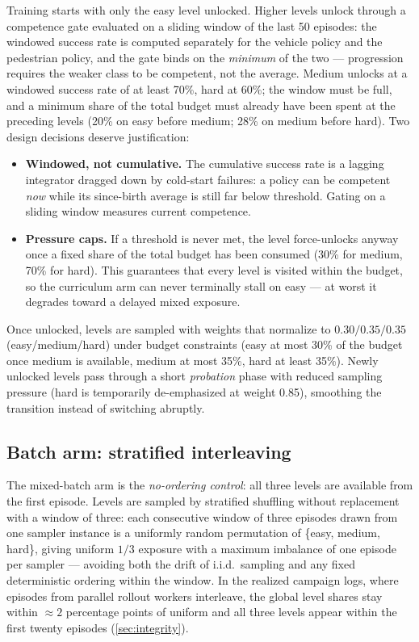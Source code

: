 Training starts with only the easy level unlocked. Higher levels unlock
through a competence gate evaluated on a sliding window of the last 50
episodes: the windowed success rate is computed separately for the vehicle
policy and the pedestrian policy, and the gate binds on the \emph{minimum}
of the two --- progression requires the weaker class to be competent, not
the average. Medium unlocks at a windowed success rate of at least 70\%,
hard at 60\%; the window must be full, and a minimum share of the total
budget must already have been spent at the preceding levels (20\% on easy
before medium; 28\% on medium before hard). Two design decisions deserve
justification:

\begin{itemize}
  \item \textbf{Windowed, not cumulative.} The cumulative success rate is
        a lagging integrator dragged down by cold-start failures: a policy
        can be competent \emph{now} while its since-birth average is still
        far below threshold. Gating on a sliding window measures current
        competence.
  \item \textbf{Pressure caps.} If a threshold is never met, the level
        force-unlocks anyway once a fixed share of the total budget has
        been consumed (30\% for medium, 70\% for hard). This guarantees
        that every level is visited within the budget, so the curriculum
        arm can never terminally stall on easy --- at worst it degrades
        toward a delayed mixed exposure.
\end{itemize}

Once unlocked, levels are sampled with weights that normalize to
$0.30/0.35/0.35$ (easy/medium/hard) under budget constraints (easy at most
30\% of the budget once medium is available, medium at most 35\%, hard at
least 35\%). Newly unlocked levels pass through a short \emph{probation}
phase with reduced sampling pressure (hard is temporarily de-emphasized at
weight 0.85), smoothing the transition instead of switching abruptly.

\subsection{Batch arm: stratified interleaving}
\label{sec:batch-arm}

The mixed-batch arm is the \emph{no-ordering control}: all three levels
are available from the first episode. Levels are sampled by stratified
shuffling without replacement with a window of three: each consecutive
window of three episodes drawn from one sampler instance is a uniformly
random permutation of \{easy, medium, hard\}, giving uniform $1/3$
exposure with a maximum imbalance of one episode per sampler --- avoiding
both the drift of i.i.d.\ sampling and any fixed deterministic ordering
within the window. In the realized campaign logs, where episodes from
parallel rollout workers interleave, the global level shares stay within
$\approx 2$ percentage points of uniform and all three levels appear
within the first twenty episodes (\cref{sec:integrity}).

